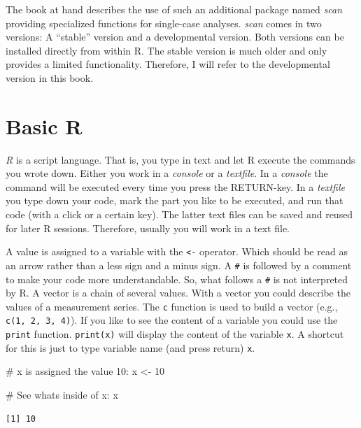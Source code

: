 \documentclass[
  letterpaper,
  DIV=11,
  numbers=noendperiod]{scrreprt}
\newenvironment{Shaded}{\begin{snugshade}}{\end{snugshade}}
\newcommand{\CommentTok}[1]{\textcolor[rgb]{0.37,0.37,0.37}{#1}}
\newcommand{\DecValTok}[1]{\textcolor[rgb]{0.68,0.00,0.00}{#1}}
\newcommand{\NormalTok}[1]{\textcolor[rgb]{0.00,0.23,0.31}{#1}}
\newcommand{\OtherTok}[1]{\textcolor[rgb]{0.00,0.23,0.31}{#1}}
\begin{document}
The book at hand describes the use of such an additional package named
\emph{scan} providing specialized functions for single-case analyses.
\emph{scan} comes in two versions: A ``stable'' version and a
developmental version. Both versions can be installed directly from
within R. The stable version is much older and only provides a limited
functionality. Therefore, I will refer to the developmental version in
this book.

\hypertarget{basic-r}{%
\section{Basic R}\label{basic-r}}

\emph{R} is a script language. That is, you type in text and let R
execute the commands you wrote down. Either you work in a \emph{console}
or a \emph{textfile}. In a \emph{console} the command will be executed
every time you press the RETURN-key. In a \emph{textfile} you type down
your code, mark the part you like to be executed, and run that code
(with a click or a certain key). The latter text files can be saved and
reused for later R sessions. Therefore, usually you will work in a text
file.

A value is assigned to a variable with the \texttt{\textless{}-}
operator. Which should be read as an arrow rather than a less sign and a
minus sign. A \texttt{\#} is followed by a comment to make your code
more understandable. So, what follows a \texttt{\#} is not interpreted
by R. A vector is a chain of several values. With a vector you could
describe the values of a measurement series. The \texttt{c} function is
used to build a vector (e.g., \texttt{c(1,\ 2,\ 3,\ 4)}). If you like to
see the content of a variable you could use the \texttt{print} function.
\texttt{print(x)} will display the content of the variable \texttt{x}. A
shortcut for this is just to type variable name (and press return)
\texttt{x}.

\begin{Shaded}
\begin{Highlighting}[]
\CommentTok{\# x is assigned the value 10:}
\NormalTok{x }\OtherTok{\textless{}{-}} \DecValTok{10}

\CommentTok{\# See what\textquotesingle{}s inside of x:}
\NormalTok{x}
\end{Highlighting}
\end{Shaded}

\begin{verbatim}
[1] 10
\end{verbatim}
\end{document}
